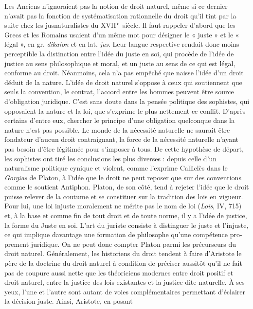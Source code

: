 Les Anciens n’ignoraient pas la notion
de droit naturel, même si ce dernier
n'avait pas la fonction de systématisation
rationnelle du droit qu'il tint par la suite
chez les jusnaturalistes du {\footnotesize XVII}$^\text{\,e}$ siècle. Il faut
rappeler d’abord que les Grecs et les
Romains usaient d’un même mot pour
désigner le « juste » et le « légal », en gr.
{\it dikaion} et en lat. {\it jus}. Leur langue respective rendait donc
 moins perceptible la distinction entre l’idée du juste en soi, qui
procède de l’idée de justice au sens philosophique et moral, et un juste au sens de
ce qui est légal, conforme au droit. Néanmoins, cela n’a pas empêché que naisse
l’idée d’un droit déduit de la nature.
L'idée de droit naturel s'oppose à ceux
qui soutiennent que seuls la convention,
le contrat, l’accord entre les hommes peuvent être source d'obligation juridique.
C’est sans doute dans la pensée politique
des sophistes, qui opposaient la nature et
la loi, que s’exprime le plus nettement ce
conflit. D’après certains d’entre eux, chercher le principe d’une obligation quelconque dans la nature n’est pas possible.
Le monde de la nécessité naturelle ne
saurait être fondateur d’aucun droit
contraignant, la force de la nécessité naturelle n’ayant pas besoin d’être légitimée
pour s'imposer à tous. De cette hypothèse
de départ, les sophistes ont tiré les conclusions les plus diverses : depuis celle d’un
naturalisme politique cynique et violent,
%
comme l’exprime Calliclès dans le {\it Gorgias} de Platon, à l’idée que le droit ne
peut reposer que sur des conventions
comme le soutient Antiphon. Platon, de
son côté, tend à rejeter l’idée que le droit
puisse relever de la coutume et se constituer sur la tradition des lois en vigueur.
Pour lui, une loi injuste moralement ne
mérite pas le nom de loi ({\it Lois}, IV, 715)
et, à la base et comme fin de tout droit et
de toute norme, il y a l’idée de justice,
la forme du Juste en soi. L’art du juriste
consiste à distinguer le juste et l’injuste,
ce qui implique davantage une formation
de philosophe qu’une compétence pro-
prement juridique. On ne peut donc
compter Platon parmi les précurseurs du
droit naturel. Généralement, les historiens du droit tendent à faire d’Aristote
le père de la doctrine du droit naturel à
condition de préciser aussitôt qu'il ne fait
pas de coupure aussi nette que les théoriciens modernes entre droit positif et droit
naturel, entre la justice des lois existantes
et la justice dite naturelle. À ses yeux,
l'une et l’autre sont autant de voies
complémentaires permettant d'éclairer la
décision juste. Ainsi, Aristote, en posant
